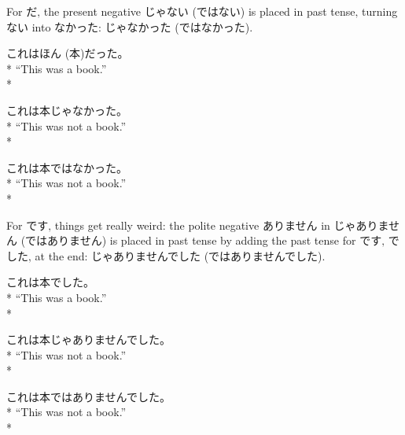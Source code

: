 \documentclass[11pt, b5paper, twoside, openright, onecolumn]{book}
\makeatletter
\newcommand*{\rubystack}[2]{{\relscale{0.5}%
  \begin{tabular}[b]{@{}c@{}}%
    {#1}\\%
   {\textscale{2}{#2}}%
  \end{tabular}}%
}
\DeclareRobustCommand*{\ruby}[2]{%
  \mbox{%
    \setlength{\parskip}{0ex}%
    \BeginAccSupp{method=pdfstringdef,ActualText={#1}}%
      \rubystack{\phantom{#2}}{#1}%
      \llap{%
        \rubystack{#2}{\phantom{#1}}%
      }%
    \EndAccSupp{}%
  }%
}
\renewcommand*{\ruby}[2]{#2 (#1)}%
\newenvironment{exampleblock}{
\setlength{\parindent}{0.6in}
\begin{minipage}[t]{\dimexpr\textwidth-\parindent}}
{\end{minipage}}
\makeatother
\begin{document}
For だ‚ the present negative じゃない (ではない) is placed in past tense‚ turning ない into なかった: じゃなかった (ではなかった).

\vspace{0.4cm}
\begin{exampleblock}
これは\ruby{本}{ほん}だった。 \\* 
“This was a book.” \\* 
\end{exampleblock}
\vspace{0.2cm}

\begin{exampleblock}
これは本じゃなかった。 \\* 
“This was not a book.” \\* 
\end{exampleblock}
\vspace{0.2cm}

\begin{exampleblock}
これは本ではなかった。 \\* 
“This was not a book.” \\* 
\end{exampleblock}
\vspace{0.2cm}

For です‚ things get really weird: the polite negative ありません in じゃありません (ではありません) is placed in past tense by adding the past tense for です‚ でした‚ at the end: じゃありませんでした (ではありませんでした).

\vspace{0.4cm}
\begin{exampleblock}
これは本でした。 \\* 
“This was a book.” \\* 
\end{exampleblock}
\vspace{0.2cm}

\begin{exampleblock}
これは本じゃありませんでした。 \\* 
“This was not a book.” \\* 
\end{exampleblock}
\vspace{0.2cm}

\begin{exampleblock}
これは本ではありませんでした。 \\* 
“This was not a book.” \\* 
\end{exampleblock}
\vspace{0.2cm}
\end{document}

